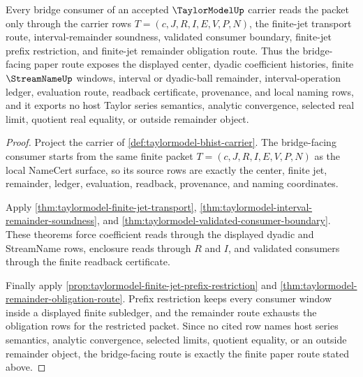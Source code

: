 \begin{theorem}\label{thm:taylormodel-bridge-facing-route}
Every bridge consumer of an accepted $\TaylorModelUp$ carrier reads the packet only through the carrier rows $T=(c,J,R,I,E,V,P,N)$, the finite-jet transport route, interval-remainder soundness, validated consumer boundary, finite-jet prefix restriction, and finite-jet remainder obligation route. Thus the bridge-facing paper route exposes the displayed center, dyadic coefficient histories, finite $\StreamNameUp$ windows, interval or dyadic-ball remainder, interval-operation ledger, evaluation route, readback certificate, provenance, and local naming rows, and it exports no host Taylor series semantics, analytic convergence, selected real limit, quotient real equality, or outside remainder object.
\end{theorem}
\begin{proof}
Project the carrier of \autoref{def:taylormodel-bhist-carrier}. The bridge-facing consumer starts from the same finite packet $T=(c,J,R,I,E,V,P,N)$ as the local NameCert surface, so its source rows are exactly the center, finite jet, remainder, ledger, evaluation, readback, provenance, and naming coordinates.

Apply \autoref{thm:taylormodel-finite-jet-transport}, \autoref{thm:taylormodel-interval-remainder-soundness}, and \autoref{thm:taylormodel-validated-consumer-boundary}. These theorems force coefficient reads through the displayed dyadic and StreamName rows, enclosure reads through $R$ and $I$, and validated consumers through the finite readback certificate.

Finally apply \autoref{prop:taylormodel-finite-jet-prefix-restriction} and \autoref{thm:taylormodel-remainder-obligation-route}. Prefix restriction keeps every consumer window inside a displayed finite subledger, and the remainder route exhausts the obligation rows for the restricted packet. Since no cited row names host series semantics, analytic convergence, selected limits, quotient equality, or an outside remainder object, the bridge-facing route is exactly the finite paper route stated above.
\end{proof}


